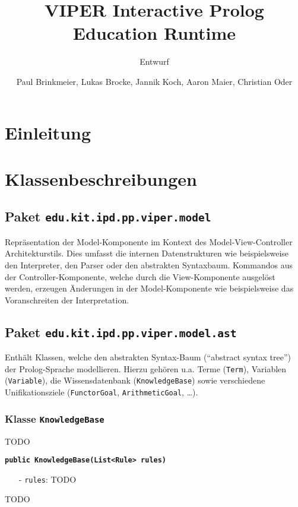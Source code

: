 \documentclass[parskip=full,11pt,twoside]{scrartcl}
\title{VIPER Interactive Prolog Education Runtime}
\subtitle{Entwurf}
\author{Paul Brinkmeier, Lukas Brocke, Jannik Koch, Aaron Maier, Christian Oder}
\begin{document}
\maketitle

\section{Einleitung}

\section{Klassenbeschreibungen}

\subsection{Paket \texttt{edu.kit.ipd.pp.viper.model}}

Repräsentation der Model-Komponente im Kontext des Model-View-Controller Architekturstils. Dies umfasst die internen Datenstrukturen wie beispielsweise den Interpreter, den Parser oder den abstrakten Syntaxbaum. Kommandos aus der Controller-Komponente, welche durch die View-Komponente ausgelöst werden, erzeugen Änderungen in der Model-Komponente wie beispielsweise das Voranschreiten der Interpretation.

\subsection{Paket \texttt{edu.kit.ipd.pp.viper.model.ast}}

Enthält Klassen, welche den abstrakten Syntax-Baum (\enquote{abstract syntax tree}) der Prolog-Sprache modellieren. Hierzu gehören u.a. Terme (\texttt{Term}), Variablen (\texttt{Variable}), die Wissensdatenbank (\texttt{KnowledgeBase}) sowie verschiedene Unifikationsziele (\texttt{FunctorGoal}, \texttt{ArithmeticGoal}, \dots).

\subsubsection{Klasse \texttt{KnowledgeBase}}
TODO

\textbf{\texttt{public KnowledgeBase(List<Rule> rules)}}
\begin{itemize}[noitemsep]
	\item[-] \texttt{rules}: TODO
\end{itemize}
TODO
\end{document}
